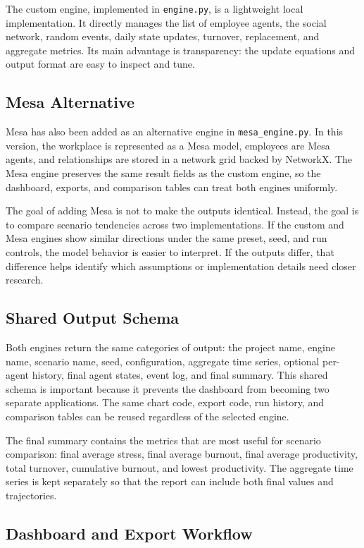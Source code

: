 \documentclass[12pt,a4paper]{article}
\begin{document}
The custom engine, implemented in \texttt{engine.py}, is a lightweight local implementation. It directly manages the list of employee agents, the social network, random events, daily state updates, turnover, replacement, and aggregate metrics. Its main advantage is transparency: the update equations and output format are easy to inspect and tune.

\subsection{Mesa Alternative}

Mesa has also been added as an alternative engine in \texttt{mesa\_engine.py}. In this version, the workplace is represented as a Mesa model, employees are Mesa agents, and relationships are stored in a network grid backed by NetworkX. The Mesa engine preserves the same result fields as the custom engine, so the dashboard, exports, and comparison tables can treat both engines uniformly.

The goal of adding Mesa is not to make the outputs identical. Instead, the goal is to compare scenario tendencies across two implementations. If the custom and Mesa engines show similar directions under the same preset, seed, and run controls, the model behavior is easier to interpret. If the outputs differ, that difference helps identify which assumptions or implementation details need closer research.

\subsection{Shared Output Schema}

Both engines return the same categories of output: the project name, engine name, scenario name, seed, configuration, aggregate time series, optional per-agent history, final agent states, event log, and final summary. This shared schema is important because it prevents the dashboard from becoming two separate applications. The same chart code, export code, run history, and comparison tables can be reused regardless of the selected engine.

The final summary contains the metrics that are most useful for scenario comparison: final average stress, final average burnout, final average productivity, total turnover, cumulative burnout, and lowest productivity. The aggregate time series is kept separately so that the report can include both final values and trajectories.

\subsection{Dashboard and Export Workflow}
\end{document}
